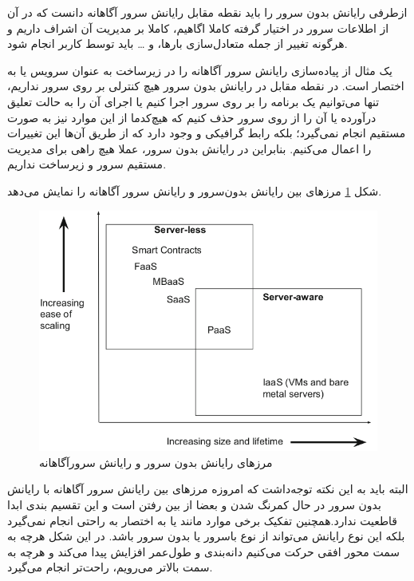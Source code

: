ازطرفی رایانش بدون سرور را باید نقطه مقابل رایانش سرور آگاهانه  دانست که در آن از اطلاعات سرور در اختیار گرفته کاملا اگاهیم، کاملا بر مدیریت آن اشراف داریم و هرگونه تغییر از جمله متعادل‌سازی بارها،  و … باید توسط کاربر انجام شود.

یک مثال از پیاده‌سازی رایانش سرور آگاهانه را در زیرساخت به عنوان سرویس  یا به اختصار  است. در نقطه مقابل در رایانش بدون سرور هیچ کنترلی بر روی سرور نداریم، تنها می‌توانیم یک برنامه را بر روی سرور اجرا کنیم یا اجرای آن را به حالت تعلیق درآورده یا آن را از روی سرور حذف کنیم که هیچ‌کدما از این موارد نیز به صورت مستقیم انجام نمی‌گیرد؛ بلکه رابط گرافیکی و  وجود دارد که از طریق آن‌‌ها این تغییرات را اعمال می‌کنیم. بنابراین در رایانش بدون سرور، عملا هیچ راهی برای مدیریت مستقیم سرور و زیرساخت نداریم.

شکل \ref{fig:ServerlessVSServeraware} مرز‌های بین رایانش بدون‌سرور و رایانش سرور آگاهانه را نمایش می‌دهد.  

\begin{figure}
	\centering
	\includegraphics[width=\linewidth]{figs/ServerlessVSServeraware}
	\caption {مرز‌های رایانش بدون سرور و رایانش سرورآگاهانه}
	\label{fig:ServerlessVSServeraware}
\end{figure}

البته باید به این نکته توجه‌داشت که امروزه مرز‌های بین رایانش سرور آگاهانه با رایانش بدون سرور در حال کمرنگ شدن و بعضا از بین رفتن است و این تقسیم بندی ابدا قاطعیت ندارد.همچنین تفکیک برخی موارد مانند  یا به اختصار  به راحتی انجام نمی‌گیرد بلکه این نوع رایانش می‌تواند از نوع باسرور یا بدون سرور باشد. 
در این شکل هرچه به سمت محور افقی حرکت می‌کنیم دانه‌بندی و طول‌عمر افزایش پیدا می‌کند و هرچه به سمت بالاتر می‌رویم،  راحت‌تر انجام می‌گیرد. 

